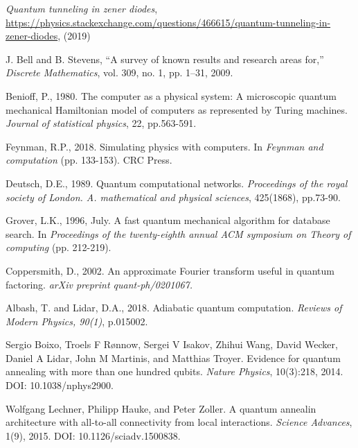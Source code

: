 
\begin{thebibliography}{}

    \textit{Quantum tunneling in zener diodes},
    \url{https://physics.stackexchange.com/questions/466615/quantum-tunneling-in-zener-diodes}, (2019)

    J. Bell and B. Stevens, “A survey of known results and research areas for,” \textit{Discrete Mathematics}, vol. 309, no. 1, pp. 1–31, 2009.
    
    Benioff, P., 1980. The computer as a physical system: A microscopic quantum mechanical Hamiltonian model of computers as represented by Turing machines. \textit{Journal of statistical physics}, 22, pp.563-591.

    Feynman, R.P., 2018. Simulating physics with computers. In \textit{Feynman and computation} (pp. 133-153). CRC Press.


    Deutsch, D.E., 1989. Quantum computational networks. \textit{Proceedings of the royal society of London. A. mathematical and physical sciences}, 425(1868), pp.73-90.

    Grover, L.K., 1996, July. A fast quantum mechanical algorithm for database search. In \textit{Proceedings of the twenty-eighth annual ACM symposium on Theory of computing} (pp. 212-219).

    Coppersmith, D., 2002. An approximate Fourier transform useful in quantum factoring. \textit{arXiv preprint quant-ph/0201067.}

    Albash, T. and Lidar, D.A., 2018. Adiabatic quantum computation. \textit{Reviews of Modern Physics, 90(1)}, p.015002.

    Sergio Boixo, Troels F Rønnow, Sergei V Isakov, Zhihui Wang, David Wecker, Daniel A Lidar, John M Martinis, and Matthias Troyer. Evidence for quantum annealing with more than one hundred qubits. \textit{Nature Physics}, 10(3):218, 2014. DOI: 10.1038/nphys2900.

    Wolfgang Lechner, Philipp Hauke, and Peter Zoller. A quantum annealin architecture with all-to-all connectivity from local interactions. \textit{Science Advances}, 1(9), 2015. DOI: 10.1126/sciadv.1500838.


\end{thebibliography}
